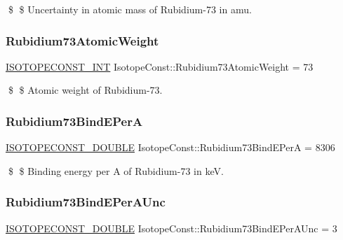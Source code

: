 \$ \$ Uncertainty in atomic mass of Rubidium-\/73 in amu. \mbox{\label{group___isotope_const-_rubidium-_rb73_ga2e3687528753fd94ea572db4dde2e2ef}} 
\subsubsection{\texorpdfstring{Rubidium73\+Atomic\+Weight}{Rubidium73AtomicWeight}}
{\footnotesize\ttfamily \mbox{\hyperlink{group___isotope_const-_macros_ga5f18360b3e99483a35c32d789e62621c}{I\+S\+O\+T\+O\+P\+E\+C\+O\+N\+S\+T\+\_\+\+I\+NT}} Isotope\+Const\+::\+Rubidium73\+Atomic\+Weight = 73}

\$ \$ Atomic weight of Rubidium-\/73. \mbox{\label{group___isotope_const-_rubidium-_rb73_gac5473b1bf6ddb4e0b39eb5a145df4254}} 
\subsubsection{\texorpdfstring{Rubidium73\+Bind\+E\+PerA}{Rubidium73BindEPerA}}
{\footnotesize\ttfamily \mbox{\hyperlink{group___isotope_const-_macros_ga8f45a7272ce02c0b4c65c44636ed719a}{I\+S\+O\+T\+O\+P\+E\+C\+O\+N\+S\+T\+\_\+\+D\+O\+U\+B\+LE}} Isotope\+Const\+::\+Rubidium73\+Bind\+E\+PerA = 8306}

\$ \$ Binding energy per A of Rubidium-\/73 in keV. \mbox{\label{group___isotope_const-_rubidium-_rb73_gaf5daf415df78436bbbdd22df890b263e}} 
\subsubsection{\texorpdfstring{Rubidium73\+Bind\+E\+Per\+A\+Unc}{Rubidium73BindEPerAUnc}}
{\footnotesize\ttfamily \mbox{\hyperlink{group___isotope_const-_macros_ga8f45a7272ce02c0b4c65c44636ed719a}{I\+S\+O\+T\+O\+P\+E\+C\+O\+N\+S\+T\+\_\+\+D\+O\+U\+B\+LE}} Isotope\+Const\+::\+Rubidium73\+Bind\+E\+Per\+A\+Unc = 3}

